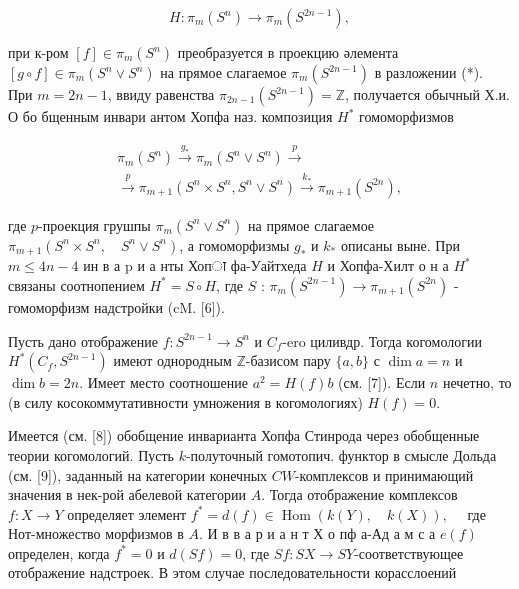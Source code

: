 \documentclass[10pt]{article}
\begin{document}
\[

H: \pi_{m}\left(S^{n}\right) \rightarrow \pi_{m}\left(S^{2 n-1}\right),

\]



при к-ром $[f] \in \pi_{m}\left(S^{n}\right)$ преобразуется в проекцию әлемента $[g \circ f] \in \pi_{m}\left(S^{n} \vee S^{n}\right)$ на прямое слагаемое $\pi_{m}\left(S^{2 n-1}\right)$ в разложении (*). При $m=2 n-1$, ввиду равенства $\pi_{2 n-1}\left(S^{2 n-1}\right)=\mathbb{Z}$, получается обычный Х.и. О бо бщенным инвари антом Хопфа наз. композиция $H^{*}$ гомоморфизмов



\[

\begin{gathered}

\pi_{m}\left(S^{n}\right) \stackrel{g_{*}}{\longrightarrow} \pi_{m}\left(S^{n} \vee S^{n}\right) \stackrel{p}{\longrightarrow} \\

\stackrel{p}{\longrightarrow} \pi_{m+1}\left(S^{n} \times S^{n}, S^{n} \vee S^{n}\right) \stackrel{k_{*}}{\longrightarrow} \pi_{m+1}\left(S^{2 n}\right),

\end{gathered}

\]



где $p$-проекция грушпы $\pi_{m}\left(S^{n} \vee S^{n}\right)$ на прямое слагаемое $\pi_{m+1}\left(S^{n} \times S^{n}, \quad S^{n} \vee S^{n}\right)$, а гомоморфизмы $g_{*}$ и $k_{*}$ описаны выне. При $m \leqslant 4 n-4$ ин в а p и а нты Хопा фа-Уайтхеда $H$ и Хопфа-Хилт о н а $H^{*}$ связаны соотнопением $H^{*}=S \circ H$, где $S$ : $\pi_{m}\left(S^{2 n-1}\right) \longrightarrow \pi_{m+1}\left(S^{2 n}\right)$ - гомоморфизм надстройки (cM. [6]).



Пусть дано отображение $f: S^{2 n-1} \longrightarrow S^{n}$ и $C_{f}$-ero циливдр. Тогда когомологии $H^{*}\left(C_{f}, S^{2 n-1}\right)$ имеют однородным $\mathbb{Z}$-базисом пару $\{a, b\}$ с $\operatorname{dim} a=n$ и $\operatorname{dim} b=2 n$. Имеет место соотношение $a^{2}=H(f) b$ (см. [7]). Если $n$ нечетно, то (в силу косокоммутативности умножения в когомологиях) $H(f)=0$.



Имеется (см. [8]) обобщение инварианта Хопфа Стинрода через обобщенные теории когомологий. Пусть $k$-полуточный гомотопич. функтор в смысле Дольда (см. [9]), заданный на категории конечных $C W$-комплексов и принимающий значения в нек-рой абелевой категории $A$. Тогда отображение комплексов $f: X \longrightarrow Y$ определяет элемент $f^{*}=d(f) \in \operatorname{Hom}(k(Y), \quad k(X)), \quad$ где Нот-множество морфизмов в $A$. И в в а р и а н т Х о пф а-Ад а м с а $e(f)$ определен, когда $f^{*}=0$ и $d(S f)=0$, где $S f: S X \longrightarrow S Y$-соответствующее отображение надстроек. В этом случае последовательности корасслоений
\end{document}

